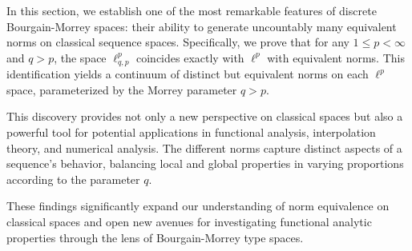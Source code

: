 \documentclass[preprint,12pt]{elsarticle}
\begin{document}
\label{sec:equivalent-norms}

In this section, we establish one of the most remarkable features of discrete Bourgain-Morrey spaces: their ability to generate uncountably many equivalent norms on classical sequence spaces. Specifically, we prove that for any $1 \leq p < \infty$ and $q > p$, the space $\ell^{p}_{q,p}$ coincides exactly with $\ell^p$ with equivalent norms. This identification yields a continuum of distinct but equivalent norms on each $\ell^p$ space, parameterized by the Morrey parameter $q > p$.

This discovery provides not only a new perspective on classical spaces but also a powerful tool for potential applications in functional analysis, interpolation theory, and numerical analysis. The different norms capture distinct aspects of a sequence's behavior, balancing local and global properties in varying proportions according to the parameter $q$.


These findings significantly expand our understanding of norm equivalence on classical spaces and open new avenues for investigating functional analytic properties through the lens of Bourgain-Morrey type spaces.
\end{document}
